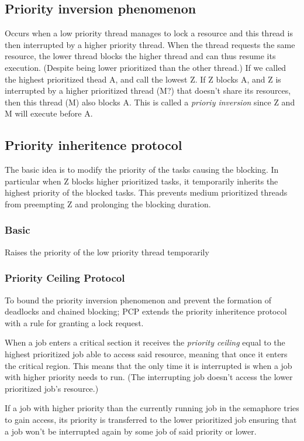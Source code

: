 \documentclass[a4paper]{article}
\begin{document}
\subsection{Priority inversion phenomenon}
Occurs when a low priority thread manages to lock a resource and this thread
is then interrupted by a higher priority thread. When the thread requests the
same resource, the lower thread blocks the higher thread and can thus resume
its execution. (Despite being lower prioritized than the other thread.)
If we called the highest prioritized thead A, and call the lowest Z. If Z
blocks A, and Z is interrupted by a higher prioritized thread (M?) that doesn't
share its resources, then this thread (M) also blocks A. This is called a 
\emph{prioriy inversion} since Z and M will execute before A.

\subsection{Priority inheritence protocol}
The basic idea is to modify the priority of the tasks causing the blocking. In
particular when Z blocks higher prioritized tasks, it temporarily inherits the
highest priority of the blocked tasks. This prevents medium prioritized threads
from preempting Z and prolonging the blocking duration.
\subsubsection{Basic}
Raises the priority of the low priority thread temporarily
\subsubsection{Priority Ceiling Protocol}
To bound the priority inversion phenomenon and prevent the formation of deadlocks
and chained blocking; PCP extends the priority inheritence protocol with a
rule for granting a lock request.

When a job enters a critical section it receives the \emph{priority ceiling} 
equal to the highest prioritized job able to access said resource, meaning that
once it enters the critical region. This means that the only time it is
interrupted is when a job with higher priority needs to run. (The interrupting
job doesn't access the lower prioritized job's resource.)

If a job with higher priority than the currently running job in the semaphore
tries to gain access, its priority is transferred to the lower prioritized job
ensuring that a job won't be interrupted again by some job of said priority or
lower.
\end{document}

